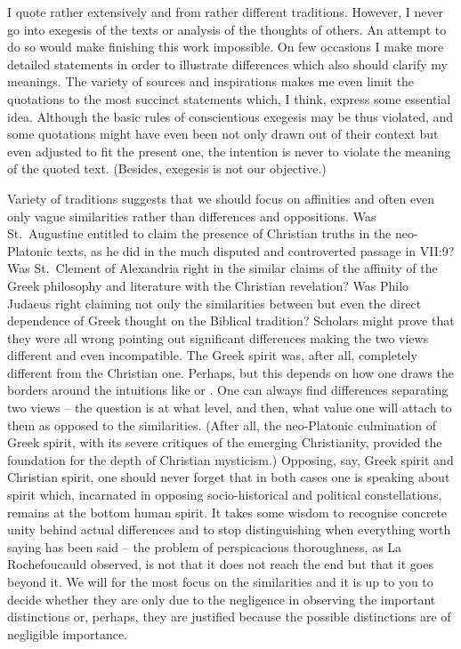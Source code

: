 I quote rather extensively and from rather different traditions.  However, I
never go into exegesis of the texts or analysis of the thoughts of others.  An
attempt to do so would make finishing this work impossible.  On few occasions I
make more detailed statements in order to illustrate differences which also
should clarify my meanings.  The variety of sources and inspirations makes me
even limit the quotations to the most succinct statements which, I think, express
some essential idea.  Although the basic rules of conscientious exegesis may be
thus violated, and some quotations might have even been not only drawn out of
their context but even adjusted to fit the present one, the intention is never
to violate the meaning of the quoted text. (Besides, exegesis is not our
objective.)

Variety of traditions suggests that we should focus on affinities and often even
only vague similarities rather than differences and oppositions.  Was
St.~Augustine entitled to claim the presence of Christian truths in the
neo-Platonic texts, as he did in the much disputed and controverted passage in
 VII:9? Was St.~Clement of Alexandria right in the
similar claims of the affinity of the Greek philosophy and literature with the
Christian revelation? Was Philo Judaeus right claiming not only the similarities
between but even the direct dependence of Greek thought on the Biblical
tradition? Scholars might prove that they were all wrong pointing out
significant differences making the two views different and even incompatible.
The Greek spirit was, after all, completely different from the Christian one.
Perhaps, but this depends on how one draws the borders around the intuitions
like  or .  One can always find
differences separating two views -- the question is at what level, and then,
what value one will attach to them as opposed to the similarities. (After all,
the neo-Platonic culmination of Greek spirit, with its severe critiques of the
emerging Christianity, provided the foundation for the depth of Christian
mysticism.) Opposing, say, Greek spirit and Christian spirit, one should never
forget that in both cases one is speaking about spirit which, incarnated in
opposing socio-historical and political constellations, remains at the bottom
human spirit. It takes some wisdom to recognise concrete unity behind actual
differences and to stop distinguishing when everything worth saying has been
said -- the problem of perspicacious thoroughness, as La Rochefoucauld observed,
is not that it does not reach the end but that it goes beyond it.
We will for the most focus on the similarities and it is up to you
to decide whether they are only due to the negligence in observing the important
distinctions or, perhaps, they are justified because the possible distinctions
are of negligible importance.

